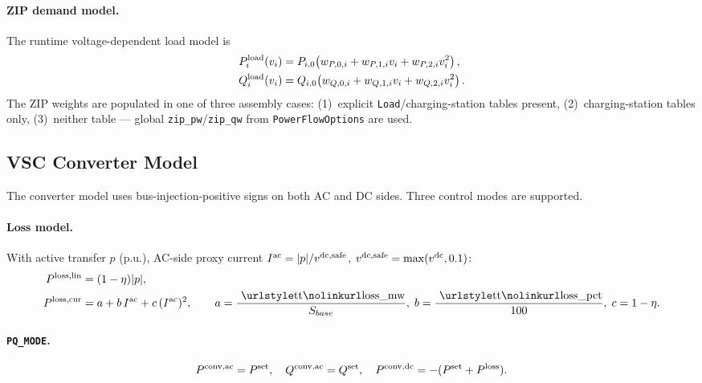 \paragraph{ZIP demand model.}
The runtime voltage-dependent load model is
\begin{align}
P_i^{\mathrm{load}}(v_i)
&= P_{i,0}\!\left(w_{P,0,i} + w_{P,1,i}v_i + w_{P,2,i}v_i^2\right), \\
Q_i^{\mathrm{load}}(v_i)
&= Q_{i,0}\!\left(w_{Q,0,i} + w_{Q,1,i}v_i + w_{Q,2,i}v_i^2\right).
\end{align}
The ZIP weights are populated in one of three assembly cases:
(1)~explicit \texttt{Load}/charging-station tables present,
(2)~charging-station tables only,
(3)~neither table — global \texttt{zip\_pw}/\texttt{zip\_qw} from
\texttt{PowerFlowOptions} are used.

\subsection{VSC Converter Model}

The converter model uses bus-injection-positive signs on both AC and DC sides.
Three control modes are supported.

\paragraph{Loss model.}
With active transfer \(p\) (p.u.), AC-side proxy current
\(I^{\mathrm{ac}}=|p|/v^{\mathrm{dc,safe}}\), \(v^{\mathrm{dc,safe}}=\max(v^{\mathrm{dc}},0.1)\):
\begin{align}
P^{\qual{loss,lin}} &= (1-\eta)|p|, \\
P^{\qual{loss,cur}} &= a + b\,I^{\qual{ac}} + c\,(I^{\qual{ac}})^2,
\qquad
a=\frac{\texttt{loss\_mw}}{S_{base}},\;
b=\frac{\texttt{loss\_pct}}{100},\;
c=1-\eta.
\end{align}

\paragraph{\texttt{PQ\_MODE}.}
\begin{align}
P^{\mathrm{conv,ac}} = P^{\mathrm{set}},\quad
Q^{\mathrm{conv,ac}} = Q^{\mathrm{set}},\quad
P^{\mathrm{conv,dc}} = -(P^{\mathrm{set}}+P^{\mathrm{loss}}).
\end{align}

